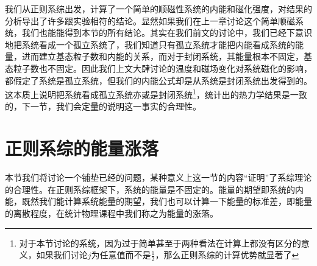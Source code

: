 \documentclass[../../main.tex]{subfiles}
\begin{document}
我们从正则系综出发，计算了一个简单的顺磁性系统的内能和磁化强度，对结果的分析导出了许多跟实验相符的结论。显然如果我们在上一章讨论这个简单顺磁系统，我们也能能得到本节的所有结论。其实在我们前文的讨论中，我们已经下意识地把系统看成一个孤立系统了，我们知道只有孤立系统才能把内能看成系统的能量，进而建立基态粒子数和内能的关系，而对于封闭系统，其能量根本不固定，基态粒子数也不固定。因此我们上文大肆讨论的温度和磁场变化对系统磁化的影响，都假定了系统是孤立系统，但我们的内能公式却是从系统是封闭系统出发得到的。这本质上说明把系统看成孤立系统亦或是封闭系统\footnote{对于本节讨论的系统，因为过于简单甚至于两种看法在计算上都没有区分的意义，如果我们讨论\(j\)为任意值而不是\(\frac{1}{2}\)，那么正则系综的计算优势就显著了}，统计出的热力学结果是一致的，下一节，我们会定量的说明这一事实的合理性。

\section{正则系综的能量涨落}

本节我们将讨论一个铺垫已经的问题，某种意义上这一节的内容“证明”了系综理论的合理性。在正则系综框架下，系统的能量是不固定的。能量的期望即系统的内能，既然我们能计算系统能量的期望，我们也可以计算一下能量的标准差，即能量的离散程度，在统计物理课程中我们称之为能量的涨落。
\end{document}
